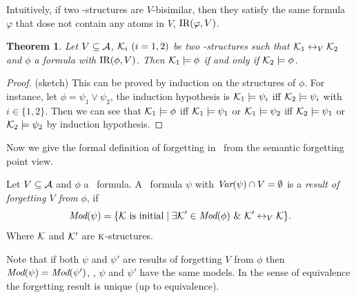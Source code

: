 \documentclass{article}
\newtheorem{theorem}{Theorem}
\begin{document}
Intuitively, if two \MPK-structures are $V$-bisimilar, then they satisfy the same formula $\varphi$ that dose not contain any atoms in $V$, \ie $\textrm{IR}(\varphi, V)$.
\begin{theorem}\label{thm:V-bisimulation:EQ}
  Let $V\subseteq\cal A$, ${\cal K}_i~(i=1,2)$ be two \MPK-structures such that
  ${\cal K}_1\leftrightarrow_V{\cal K}_2$ and $\phi$ a formula with $\textrm{IR}(\phi,V)$. Then
  ${\cal K}_1\models\phi$ if and only if ${\cal K}_2\models\phi$.
\end{theorem}
\begin{proof}(sketch)
This can be proved by induction on the structures of $\phi$. %
For instance, let $\phi = \psi_1 \vee \psi_2$, the induction hypothesis is ${\cal K}_1 \models \psi_i$ iff ${\cal K}_2 \models \psi_i$ with $i\in \{1,2\}$. Then we can see that ${\cal K}_1 \models \phi$ iff ${\cal K}_1 \models \psi_1$ or ${\cal K}_1 \models \psi_2$ iff ${\cal K}_2 \models \psi_1$ or ${\cal K}_2 \models \psi_2$ by induction hypothesis.
\end{proof}

Now we give the formal definition of forgetting in \CTL\ from the semantic forgetting point view.
\begin{definition}[Forgetting]\label{def:V:forgetting}
  Let $V\subseteq\cal A$ and $\phi$ a \CTL\ formula.
A \CTL\ formula $\psi$ with $\textit{Var}(\psi)\cap V=\emptyset$
is a {\em result of forgetting $V$ from} $\phi$, if
\begin{equation*}
  \textit{Mod}(\psi)=\{{\cal K}\mbox{ is initial}\mid \exists {\cal K}'\in\textit{Mod}(\phi)\ \&\ {\cal K}'\leftrightarrow_V{\cal K}\}.
\end{equation*}
Where $\cal K$ and ${\cal K}'$ are $\textsc{k}$-structures.
\end{definition}
Note that if both $\psi$ and $\psi'$ are results of forgetting $V$ from $\phi$ then
$\textit{Mod}(\psi)=\textit{Mod}(\psi')$, \ie, $\psi$ and $\psi'$ have the same models. In the sense
of equivalence the forgetting result is unique (up to equivalence).
\end{document}
